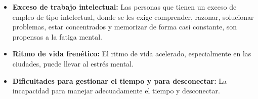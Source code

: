 \begin{itemize}


  \item \textbf{Exceso de trabajo intelectual:} Las personas que tienen un exceso de empleo de tipo intelectual, donde se les exige comprender, razonar, solucionar problemas, estar concentrados y memorizar de forma casi constante, son propensas a la fatiga mental.

  \item \textbf{Ritmo de vida frenético:} El ritmo de vida acelerado, especialmente en las ciudades, puede llevar al estrés mental.

  \item \textbf{Dificultades para gestionar el tiempo y para desconectar:} La incapacidad para manejar adecuadamente el tiempo y desconectar.


\end{itemize}



















